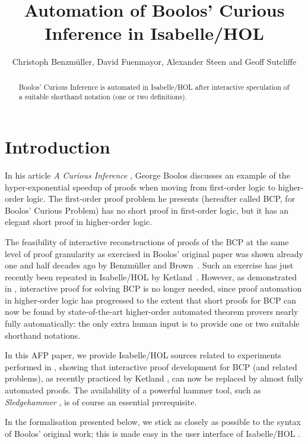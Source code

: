 \documentclass[11pt,a4paper]{article}
\begin{document}
\title{Automation of Boolos' Curious Inference in Isabelle/HOL}
\author{Christoph Benzmüller, David Fuenmayor, Alexander Steen and Geoff Sutcliffe}

\maketitle

\begin{abstract}
  Boolos' Curious Inference is automated in Isabelle/HOL after interactive speculation of a suitable shorthand notation (one or two definitions).
\end{abstract}

\tableofcontents

\section{Introduction}
In his article \textit{A Curious Inference} \cite{BCI}, George Boolos discusses an example of the hyper-exponential speedup of proofs when moving from first-order logic to higher-order logic. The first-order proof problem he presents (hereafter called BCP, for Boolos' Curious Problem) has no short proof in first-order logic, but it has an elegant short proof in higher-order logic.

The feasibility of interactive reconstructions of proofs of the BCP at the same level of proof granularity as exercised in Boolos' original paper was shown already one and half decades ago by Benzmüller and Brown~\cite{BoolosOmegaMizar}. Such an exercise has just recently been repeated in Isabelle/HOL by Ketland~\cite{KetlandAFP}.
However, as demonstrated in \cite{J63}, interactive proof for solving BCP is no longer needed, since proof automation in higher-order logic has progressed to the extent that short proofs for BCP can now be found by state-of-the-art higher-order automated theorem provers nearly fully automatically: the only extra human input is to provide one or two suitable shorthand notations. 

In this AFP paper, we provide Isabelle/HOL sources related to experiments performed in \cite{J63}, showing that interactive proof development for BCP (and related problems), as recently practiced by Ketland \cite{KetlandAFP}, can now be replaced by almost fully automated proofs. The availability of a powerful hammer tool, such as \textit{Sledgehammer} \cite{Sledgehammer}, is of course an essential prerequisite.

In the formalisation presented below, we stick as closely as possible to the syntax of Boolos' original work; this is made easy in the user interface of Isabelle/HOL \cite{IsabelleJEDIT}.





\end{document}
